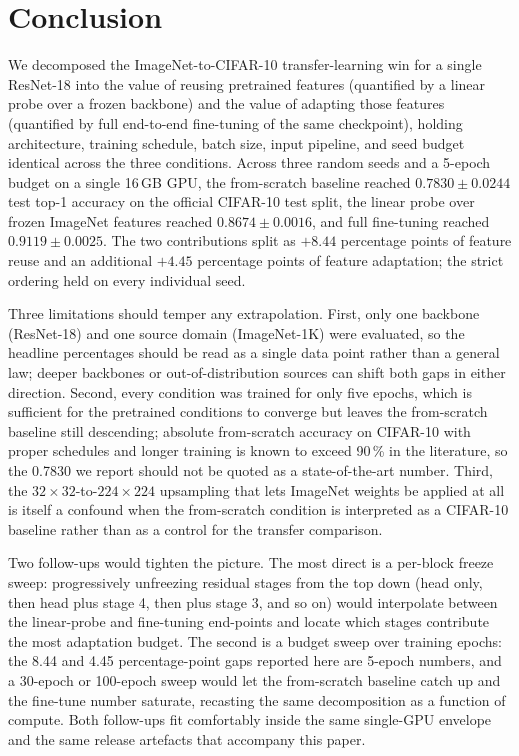 \documentclass[11pt,twocolumn]{article}
\begin{document}
\section{Conclusion}
\label{sec:conclusion}

We decomposed the ImageNet-to-CIFAR-10 transfer-learning win for a
single ResNet-18 into the value of reusing pretrained features
(quantified by a linear probe over a frozen backbone) and the value
of adapting those features (quantified by full end-to-end
fine-tuning of the same checkpoint), holding architecture, training
schedule, batch size, input pipeline, and seed budget identical
across the three conditions. Across three random seeds and a 5-epoch
budget on a single 16\,GB GPU, the from-scratch baseline reached
$0.7830 \pm 0.0244$ test top-1 accuracy on the
official CIFAR-10 test split, the linear probe over frozen ImageNet
features reached $0.8674 \pm 0.0016$, and full fine-tuning
reached $\mathbf{0.9119 \pm 0.0025}$. The two
contributions split as $+8.44$ percentage points of feature
reuse and an additional $+4.45$ percentage points of
feature adaptation; the strict ordering held on every individual
seed.

Three limitations should temper any extrapolation. First, only one
backbone (ResNet-18) and one source domain (ImageNet-1K) were
evaluated, so the headline percentages should be read as a single
data point rather than a general law; deeper backbones or
out-of-distribution sources can shift both gaps in either direction.
Second, every condition was trained for only five epochs, which is
sufficient for the pretrained conditions to converge but leaves the
from-scratch baseline still descending; absolute from-scratch
accuracy on CIFAR-10 with proper schedules and longer training is
known to exceed 90\,\% in the literature, so the 0.7830 we
report should not be quoted as a state-of-the-art number. Third, the
$32{\times}32$-to-$224{\times}224$ upsampling that lets ImageNet
weights be applied at all is itself a confound when the from-scratch
condition is interpreted as a CIFAR-10 baseline rather than as a
control for the transfer comparison.

Two follow-ups would tighten the picture. The most direct is a
per-block freeze sweep: progressively unfreezing residual stages from
the top down (head only, then head plus stage 4, then plus stage 3,
and so on) would interpolate between the linear-probe and
fine-tuning end-points and locate which stages contribute the most
adaptation budget. The second is a budget sweep over training
epochs: the 8.44 and 4.45
percentage-point gaps reported here are 5-epoch numbers, and a
30-epoch or 100-epoch sweep would let the from-scratch baseline catch
up and the fine-tune number saturate, recasting the same
decomposition as a function of compute. Both follow-ups fit
comfortably inside the same single-GPU envelope and the same release
artefacts that accompany this paper.


\FloatBarrier


\end{document}
